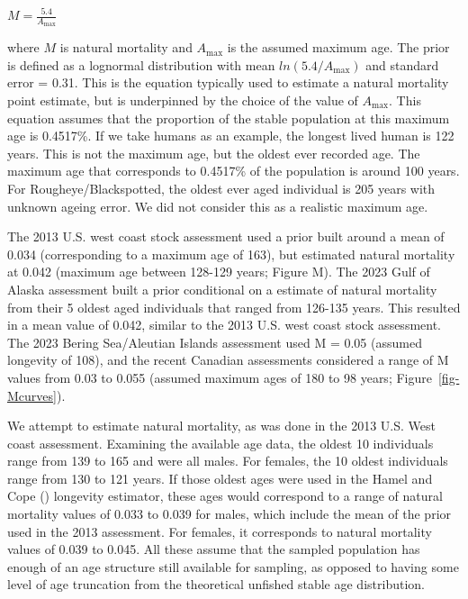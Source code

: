 \documentclass[
]{scrartcl}
\begin{document}
\begin{centering}

$M=\frac{5.4}{A_{\text{max}}}$

\end{centering}

\vspace{0.5cm}

where \(M\) is natural mortality and \({A_{\text{max}}}\) is the assumed
maximum age. The prior is defined as a lognormal distribution with mean
\(ln(5.4/A_{\text{max}})\) and standard error = 0.31. This is the
equation typically used to estimate a natural mortality point estimate,
but is underpinned by the choice of the value of \({A_{\text{max}}}\).
This equation assumes that the proportion of the stable population at
this maximum age is 0.4517\%. If we take humans as an example, the
longest lived human is 122 years. This is not the maximum age, but the
oldest ever recorded age. The maximum age that corresponds to 0.4517\%
of the population is around 100 years. For Rougheye/Blackspotted, the
oldest ever aged individual is 205 years with unknown ageing error. We
did not consider this as a realistic maximum age.

The 2013 U.S. west coast stock assessment used a prior built around a
mean of 0.034 (corresponding to a maximum age of 163), but estimated
natural mortality at 0.042 (maximum age between 128-129 years; Figure
M). The 2023 Gulf of Alaska assessment built a prior conditional on a
estimate of natural mortality from their 5 oldest aged individuals that
ranged from 126-135 years. This resulted in a mean value of 0.042,
similar to the 2013 U.S. west coast stock assessment. The 2023 Bering
Sea/Aleutian Islands assessment used M = 0.05 (assumed longevity of
108), and the recent Canadian assessments considered a range of M values
from 0.03 to 0.055 (assumed maximum ages of 180 to 98 years;
Figure~\ref{fig-Mcurves}).

We attempt to estimate natural mortality, as was done in the 2013 U.S.
West coast assessment. Examining the available age data, the oldest 10
individuals range from 139 to 165 and were all males. For females, the
10 oldest individuals range from 130 to 121 years. If those oldest ages
were used in the Hamel and Cope
() longevity estimator, these
ages would correspond to a range of natural mortality values of 0.033 to
0.039 for males, which include the mean of the prior used in the 2013
assessment. For females, it corresponds to natural mortality values of
0.039 to 0.045. All these assume that the sampled population has enough
of an age structure still available for sampling, as opposed to having
some level of age truncation from the theoretical unfished stable age
distribution.
\end{document}
